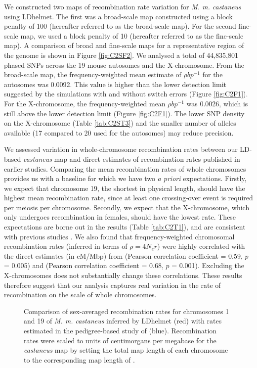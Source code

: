 We constructed two maps of recombination rate variation for \textit{M. m. castaneus} using LDhelmet. The first was a broad-scale map constructed using a block penalty of 100 (hereafter referred to as the broad-scale map). For the second fine-scale map, we used a block penalty of 10 (hereafter referred to as the fine-scale map). A comparison of broad and fine-scale maps for a representative region of the genome is shown in Figure \ref{fig:C2SF2}. We analysed a total of 44,835,801 phased SNPs across the 19 mouse autosomes and the X-chromosome. From the broad-scale map, the frequency-weighted mean estimate of $\rho bp^{-1}$ for the autosomes was 0.0092. This value is higher than the lower detection limit suggested by the simulations with and without switch errors (Figure \ref{fig:C2F1}). For the X-chromosome, the frequency-weighted mean $\rho bp^{-1}$ was 0.0026, which is still above the lower detection limit (Figure \ref{fig:C2F1}). The lower SNP density on the X-chromosome (Table \ref{tab:C2ST3}) and the smaller number of alleles available (17 compared to 20 used for the autosomes) may reduce precision. 
 
We assessed variation in whole-chromosome recombination rates between our LD-based \textit{castaneus} map and direct estimates of recombination rates published in earlier studies. Comparing the mean recombination rates of whole chromosomes provides us with a baseline for which we have two \textit{a priori} expectations. Firstly, we expect that chromosome 19, the shortest in physical length, should have the highest mean recombination rate, since at least one crossing-over event is required per meiosis per chromosome. Secondly, we expect that the X-chromosome, which only undergoes recombination in females, should have the lowest rate. These expectations are borne out in the results (Table \ref{tab:C2T1}), and are consistent with previous studies \citep{RN184, RN232}. We also found that frequency-weighted chromosomal recombination rates (inferred in terms of $\rho = 4N_er$) were highly correlated with the direct estimates (in cM/Mbp) from \cite{RN184} (Pearson correlation coefficient = 0.59, $p$ = 0.005) and \cite{RN232} (Pearson correlation coefficient = 0.68, $p$ = 0.001). Excluding the X-chromosomes does not substantially change these correlations. These results therefore suggest that our analysis captures real variation in the rate of recombination on the scale of whole chromosomes. 


\begin{figure}[h]
   \centering      
   \noindent{}
 \caption[Comparison of LD-based and pedigree-based recombination maps]{Comparison of sex-averaged recombination rates for chromosomes 1 and 19 of \emph{M. m. castaneus} inferred by LDhelmet (red) with rates estimated in the pedigree-based study of \cite{RN232} (blue). Recombination rates were scaled to units of centimorgans per megabase for the \textit{castaneus} map by setting the total map length of each chromosome to the corresponding map length of \cite{RN232}.}
\label{fig:C2F2}

\end{figure}

